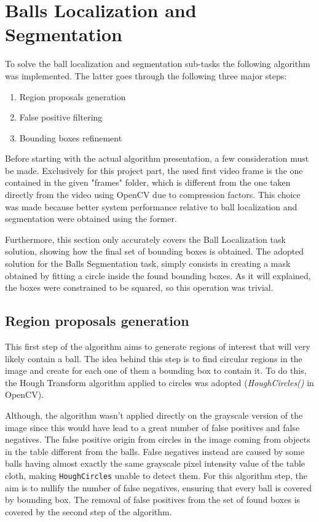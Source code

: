 \section{Balls Localization and Segmentation}

To solve the ball localization and segmentation sub-tasks the following algorithm was implemented.
The latter goes through the following three major steps:
\begin{enumerate}
    \item Region proposals generation
    \item False positive filtering
    \item Bounding boxes refinement
\end{enumerate}
\noindent
Before starting with the actual algorithm presentation, a few consideration must be made.
Exclusively for this project part, the used first video frame is the one contained in the given "frames" folder, which is different
from the one taken directly from the video using OpenCV due to compression factors. This choice was made because better system performance relative to 
ball localization and segmentation were obtained using the former.

Furthermore, this section only accurately covers the Ball Localization task solution, showing how the final set of bounding boxes is obtained.
The adopted solution for the Balls Segmentation task, simply consists in creating a mask obtained by fitting a circle inside the found bounding boxes.
As it will explained, the boxes were constrained to be squared, so this operation was trivial.


\subsection{Region proposals generation}
This first step of the algorithm aims to generate regions of interest that will very likely 
contain a ball. The idea behind this step is to find circular regions in the image and create for each one of them
a bounding box to contain it. To do this, the Hough Transform algorithm applied to circles was adopted
(\textit{HoughCircles()} in OpenCV).

Although, the algorithm wasn't applied directly on the grayscale version of the image since
this would have lead to a great number of false positives and false negatives. 
The false positive origin from circles in the image coming from objects in the table different from the balls.
False negatives instead are caused by some balls having almost exactly the same grayscale pixel intensity value of the table cloth,
making \verb|HoughCircles| unable to detect them.
For this algorithm step, the aim is to nullify the number of false negatives, ensuring that every ball is covered by bounding box.
The removal of false positives from the set of found boxes is covered by the second step of the algorithm.

